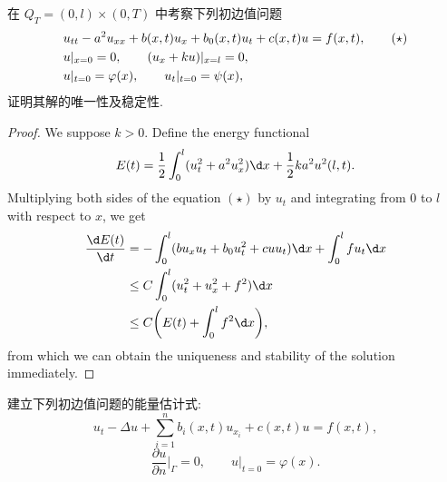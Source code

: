 \begin{exercise}[3]
  在 $Q_T = (0,l)\times (0,T)$ 中考察下列初边值问题
  \begin{align}
    & u_{tt} - a^2 u_{xx} + b(x,t)u_x + b_0(x,t)u_t + c(x,t)u = f(x,t), \tag{$\star$} \\
    & u|_{x=0} = 0,\qquad (u_x + ku)|_{x=l} = 0, \notag \\
    & u|_{t=0} = \varphi(x), \qquad u_t|_{t=0} = \psi(x), \notag
  \end{align}
  证明其解的唯一性及稳定性.
\end{exercise}

\begin{proof}
  We suppose $k>0$. Define the energy functional
  \[ E(t) = \frac12 \int_0^l (u_t^2 + a^2 u_x^2) \d x + \frac12 ka^2 u^2(l,t). \]
  Multiplying both sides of the equation $(\star)$ by $u_t$ and integrating
  from $0$ to $l$ with respect to $x$, we get
  \begin{align*}
    \frac{\d E(t)}{\d t}
    & = - \int_0^l (bu_xu_t + b_0 u_t^2 + cuu_t) \d x
        + \int_0^l fu_t \d x \\
    & \leq C\int_0^l (u_t^2 + u_x^2 + f^2) \d x \\
    & \leq C\biggl(E(t) + \int_0^l f^2 \d x\biggr),
  \end{align*}
  from which we can obtain the uniqueness and stability of the solution immediately.
\end{proof}


\begin{exercise}
  建立下列初边值问题的能量估计式:
  \[u_t - \Delta u + \sum_{i=1}^n b_i(x,t) u_{x_i} + c(x,t)u = f(x,t),\]
  \[\frac{\partial u}{\partial n}\bigg|_{\varGamma} = 0,
    \qquad u|_{t=0} = \varphi(x).\]
\end{exercise}

